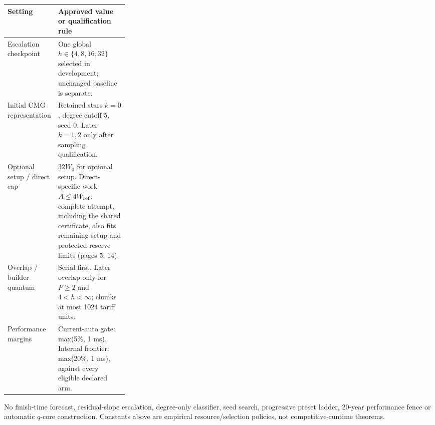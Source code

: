 \documentclass[11pt,letterpaper]{article}
\newcommand{\smallbody}{\fontsize{9.4}{11.65}\selectfont\color{Ink}\RaggedRight}
\begin{document}
{\smallbody
\begin{tabularx}{\linewidth}{P{0.28\linewidth}Y}
\toprule
\textbf{Setting} & \textbf{Approved value or qualification rule}\\
\midrule
Escalation checkpoint & One global $h\in\{4,8,16,32\}$ selected in development; unchanged baseline is separate.\\
Initial CMG representation & Retained stars $k=0$, degree cutoff 5, seed 0. Later $k=1,2$ only after sampling qualification.\\
Optional setup / direct cap & $32W_0$ for optional setup. Direct-specific work $A\le4W_{\rm ref}$; complete attempt, including the shared certificate, also fits remaining setup and protected-reserve limits (pages 5, 14).\\
Overlap / builder quantum & Serial first. Later overlap only for $P\ge2$ and $4<h<\infty$; chunks at most 1024 tariff units.\\
Performance margins & Current-auto gate: max(5\%, 1 ms). Internal frontier: max(20\%, 1 ms), against every eligible declared arm.\\
\bottomrule
\end{tabularx}}
\begin{note}\smallbody
No finish-time forecast, residual-slope escalation, degree-only classifier, seed search, progressive preset ladder, 20-year performance fence or automatic $q$-core construction. Constants above are empirical resource/selection policies, not competitive-runtime theorems.
\end{note}
\end{document}
